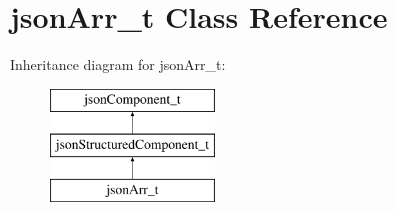 \hypertarget{classjsonArr__t}{\section{json\-Arr\-\_\-t \-Class \-Reference}
\label{classjsonArr__t}
}
\-Inheritance diagram for json\-Arr\-\_\-t\-:\begin{figure}[H]
\begin{center}
\leavevmode
\includegraphics[height=3.000000cm]{classjsonArr__t}
\end{center}
\end{figure}
